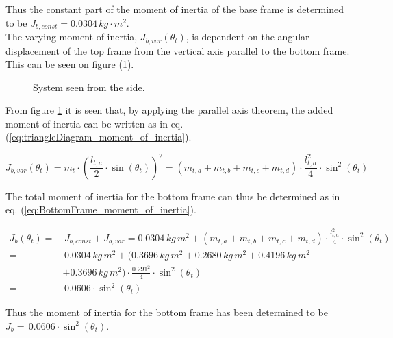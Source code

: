\documentclass[../../main]{subfiles}
\begin{document}
Thus the constant part of the moment of inertia of the base frame is determined to be $J_{b,const} = 0.0304 \si{\,kg\cdot m^2}$.\\
The varying moment of inertia, $J_{b,var}(\theta_t)$, is dependent on the angular displacement of the top frame from the vertical axis parallel to the bottom frame. This can be seen on figure (\ref{fig:TrekantDiagram}).

\begin{figure}[H]
  \centering
  \def\svgwidth{0.4\columnwidth}
  
  \caption{System seen from the side.}
  \label{fig:TrekantDiagram}
\end{figure}

From figure \ref{fig:TrekantDiagram} it is seen that, by applying the parallel axis theorem, the added moment of inertia can be written as in eq. (\ref{eq:triangleDiagram_moment_of_inertia}).

\begin{equation}
  \label{eq:triangleDiagram_moment_of_inertia}
  J_{b,var}(\theta_t) = m_{t} \cdot \left( \frac{l_{t,a}}{2} \cdot \sin(\theta_t) \right)^2 = ( m_{t,a} + m_{t,b} + m_{t,c} + m_{t,d} ) \cdot \frac{l_{t,a}^2}{4} \cdot \sin^2(\theta_t)
\end{equation}

The total moment of inertia for the bottom frame can thus be determined as in eq. (\ref{eq:BottomFrame_moment_of_inertia}).

\begin{equation}
  \label{eq:BottomFrame_moment_of_inertia}
\begin{split}
    J_{b}(\theta_t) =& \, J_{b,const} + J_{b,var} = 0.0304 \si{\, kg \, m^2} + ( m_{t,a} + m_{t,b} + m_{t,c} + m_{t,d} ) \cdot \frac{l_{t,a}^2}{4} \cdot \sin^2(\theta_t)\\
    =& \, 0.0304 \si{\, kg \, m^2} + ( 0.3696 \si{\, kg \, m^2} + 0.2680 \si{\, kg \, m^2} + 0.4196 \si{\, kg \, m^2}\\
    &+ 0.3696 \si{\, kg \, m^2}) \cdot \frac{0.291^2}{4} \cdot \sin^2(\theta_t)\\
    =& \, 0.0606\cdot \sin^2(\theta_t)
\end{split}
\end{equation}

Thus the moment of inertia for the bottom frame has been determined to be
\newline $J_{b} = \, 0.0606 \cdot \sin^2(\theta_t)$.
\end{document}
